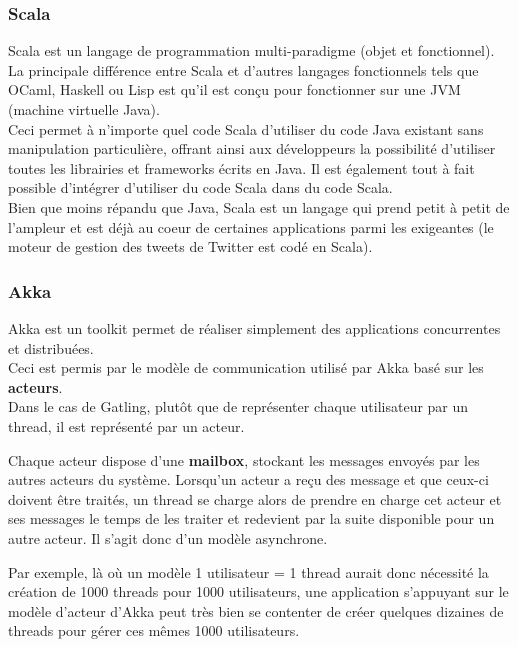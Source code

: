 \subsubsection{Scala}

Scala est un langage de programmation multi-paradigme (objet et fonctionnel).\\

La principale différence entre Scala et d'autres langages fonctionnels tels que OCaml, Haskell ou Lisp est qu'il est conçu pour fonctionner sur une JVM (machine virtuelle Java).\\
 Ceci permet à n'importe quel code Scala d'utiliser du code Java existant sans manipulation particulière, offrant ainsi aux développeurs la possibilité d'utiliser toutes les librairies et frameworks écrits en Java. Il est également tout à fait possible d'intégrer d'utiliser du code Scala dans du code Scala.\\

Bien que moins répandu que Java, Scala est un langage qui prend petit à petit de l'ampleur et est déjà au coeur de certaines applications parmi les exigeantes (le moteur de gestion des tweets de Twitter est codé en Scala).

\subsubsection{Akka}

Akka est un toolkit permet de réaliser simplement des applications concurrentes et distribuées.\\
Ceci est permis par le modèle de communication utilisé par Akka basé sur les \textbf{acteurs}.\\

Dans le cas de Gatling, plutôt que de représenter chaque utilisateur par un thread, il est représenté par un acteur.

Chaque acteur dispose d'une \textbf{mailbox}, stockant les messages envoyés par les autres acteurs du système. Lorsqu'un acteur a reçu des message et que ceux-ci doivent être traités, un thread se charge alors de \og prendre en charge \fg{} cet acteur et ses messages le temps de les traiter et redevient par la suite disponible pour un autre acteur. Il s'agit donc d'un modèle asynchrone.

Par exemple, là où un modèle 1 utilisateur = 1 thread aurait donc nécessité la création de 1000 threads pour 1000 utilisateurs, une application s'appuyant sur le modèle d'acteur d'Akka  peut très bien se contenter de créer quelques dizaines de threads pour gérer ces mêmes 1000 utilisateurs.\\

